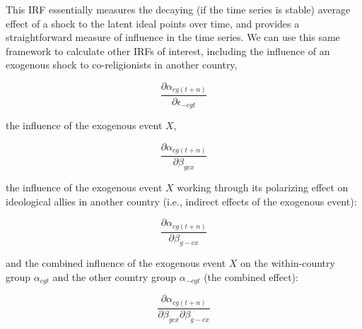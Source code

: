 \documentclass[12pt]{article}
\begin{document}
This IRF essentially measures the decaying (if the time series is stable) average effect of a shock to the latent ideal points over time, and provides a straightforward measure of influence in the time series. We can use this same framework to calculate other IRFs of interest, including the influence of an exogenous shock to co-religionists in another country,

\begin{equation}
\frac{\partial \alpha_{cg(t+n)}}{\partial \epsilon_{-cgt}}
\end{equation}

the influence of the exogenous event $X$,

\begin{equation}
\frac{\partial \alpha_{cg(t+n)}}{\partial \beta_{gcx}}
\end{equation}

the influence of the exogenous event $X$ working through its polarizing effect on ideological allies in another country (i.e., indirect effects of the exogenous event):

\begin{equation}
\frac{\partial \alpha_{cg(t+n)}}{\partial \beta_{g-cx}}
\end{equation}

and the combined influence of the exogenous event $X$ on the within-country group $\alpha_{cgt}$ and the other country group $\alpha_{-cgt}$ (the combined effect):

\begin{equation}
\frac{\partial \alpha_{cg(t+n)}}{\partial \beta_{gcx}\partial \beta_{g-cx}}
\end{equation}
\end{document}
